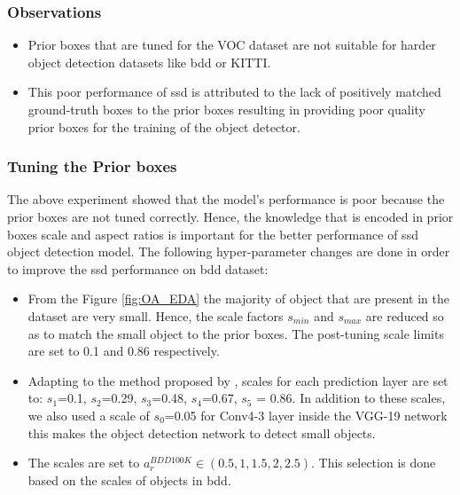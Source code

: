     \subsubsection{Observations}
    \begin{itemize}
        \item Prior boxes that are tuned for the VOC dataset are not suitable for harder object detection datasets like \acrshort{bdd} or KITTI.
        \item This poor performance of \acrshort{ssd} is attributed to the lack of positively matched ground-truth boxes to the prior boxes resulting in providing poor quality prior boxes for the training of the object detector.
    \end{itemize}

    \subsubsection{Tuning the Prior boxes}
    The above experiment showed that the model's performance is poor because the prior boxes are not tuned correctly.  Hence, the knowledge that is encoded in prior boxes scale and aspect ratios is important for the better performance of \acrshort{ssd} object detection model. The following hyper-parameter changes are done in order to improve the \acrshort{ssd} performance on \acrshort{bdd} dataset:
    \begin{itemize}
        \item From the Figure \ref{fig:OA_EDA} the majority of object that are present in the dataset are very small. Hence, the scale factors $s_{min}$ and $s_{max}$ are reduced so as to match the small object to the prior boxes. The post-tuning scale limits are set to 0.1 and 0.86 respectively.
        \item Adapting to the method proposed by \citet{Liu2016SSDSS}, scales for each prediction layer are set to: $s_1$=0.1, $s_2$=0.29, $s_3$=0.48, $s_4$=0.67, $s_5$ = 0.86. In addition to these scales, we also used a scale of $s_0$=0.05 for Conv4-3 layer inside the VGG-19 network this makes the object detection network to detect small objects.
        \item The scales are set to $a_{r}^{BDD100K} \in (0.5, 1, 1.5, 2, 2.5)$. This selection is done based on the scales of objects in \acrshort{bdd}.
    \end{itemize}
    
        
